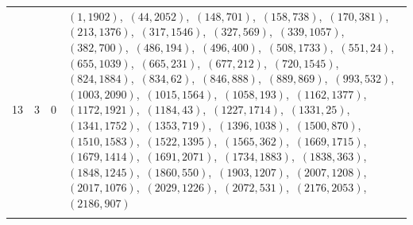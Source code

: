 \documentclass[11pt]{article}
\begin{document}
\begin{longtable}{@{}rrl>{\raggedright\arraybackslash}p{}@{}}
13 & 3 & $0$ & $(1,1902)$,\allowbreak\ $(44,2052)$,\allowbreak\ $(148,701)$,\allowbreak\ $(158,738)$,\allowbreak\ $(170,381)$,\allowbreak\ $(213,1376)$,\allowbreak\ $(317,1546)$,\allowbreak\ $(327,569)$,\allowbreak\ $(339,1057)$,\allowbreak\ $(382,700)$,\allowbreak\ $(486,194)$,\allowbreak\ $(496,400)$,\allowbreak\ $(508,1733)$,\allowbreak\ $(551,24)$,\allowbreak\ $(655,1039)$,\allowbreak\ $(665,231)$,\allowbreak\ $(677,212)$,\allowbreak\ $(720,1545)$,\allowbreak\ $(824,1884)$,\allowbreak\ $(834,62)$,\allowbreak\ $(846,888)$,\allowbreak\ $(889,869)$,\allowbreak\ $(993,532)$,\allowbreak\ $(1003,2090)$,\allowbreak\ $(1015,1564)$,\allowbreak\ $(1058,193)$,\allowbreak\ $(1162,1377)$,\allowbreak\ $(1172,1921)$,\allowbreak\ $(1184,43)$,\allowbreak\ $(1227,1714)$,\allowbreak\ $(1331,25)$,\allowbreak\ $(1341,1752)$,\allowbreak\ $(1353,719)$,\allowbreak\ $(1396,1038)$,\allowbreak\ $(1500,870)$,\allowbreak\ $(1510,1583)$,\allowbreak\ $(1522,1395)$,\allowbreak\ $(1565,362)$,\allowbreak\ $(1669,1715)$,\allowbreak\ $(1679,1414)$,\allowbreak\ $(1691,2071)$,\allowbreak\ $(1734,1883)$,\allowbreak\ $(1838,363)$,\allowbreak\ $(1848,1245)$,\allowbreak\ $(1860,550)$,\allowbreak\ $(1903,1207)$,\allowbreak\ $(2007,1208)$,\allowbreak\ $(2017,1076)$,\allowbreak\ $(2029,1226)$,\allowbreak\ $(2072,531)$,\allowbreak\ $(2176,2053)$,\allowbreak\ $(2186,907)$\\
\addlinespace[3pt]
\end{longtable}
\endgroup
\end{document}
